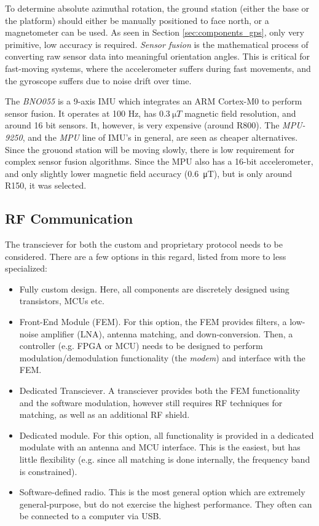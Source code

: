To determine absolute azimuthal rotation, the ground station (either the base or the platform) should either be manually positioned to face north, or a magnetometer can be used. As seen in Section \ref{sec:components_gps}, only very primitive, low accuracy is required. \textit{Sensor fusion} is the mathematical process of converting raw sensor data into meaningful orientation angles. This is critical for fast-moving systems, where the accelerometer suffers during fast movements, and the gyroscope suffers due to noise drift over time.

The \textit{BNO055} is a 9-axis IMU which integrates an ARM Cortex-M0 to perform sensor fusion. It operates at 100 Hz, has $\SI{0.3}{\micro T}$ magnetic field resolution, and around 16 bit sensors. It, however, is very expensive (around R800). The \textit{MPU-9250}, and the \textit{MPU} line of IMU's in general, are seen as cheaper alternatives. Since the grouond station will be moving slowly, there is low requirement for complex sensor fusion algorithms. Since the MPU also has a 16-bit accelerometer, and only slightly lower magnetic field accuracy (\SI{0.6}{\micro T}), but is only around R150, it was selected.

\subsection{RF Communication}
The transciever for both the custom and proprietary protocol needs to be considered. There are a few options in this regard, listed from more to less specialized:
\begin{itemize}
    \item Fully custom design. Here, all components are discretely designed using transistors, MCUs etc.
    \item Front-End Module (FEM). For this option, the FEM provides filters, a low-noise amplifier (LNA), antenna matching, and down-conversion. Then, a controller (e.g. FPGA or MCU) needs to be designed to perform modulation/demodulation functionality (the \textit{modem}) and interface with the FEM.
    \item Dedicated Transciever. A transciever provides both the FEM functionality and the software modulation, however still requires RF techniques for matching, as well as an additional RF shield.
    \item Dedicated module. For this option, all functionality is provided in a dedicated modulate with an antenna and MCU interface. This is the easiest, but has little flexibility (e.g. since all matching is done internally, the frequency band is constrained).
    \item Software-defined radio. This is the most general option which are extremely general-purpose, but do not exercise the highest performance. They often can be connected to a computer via USB.
\end{itemize}

